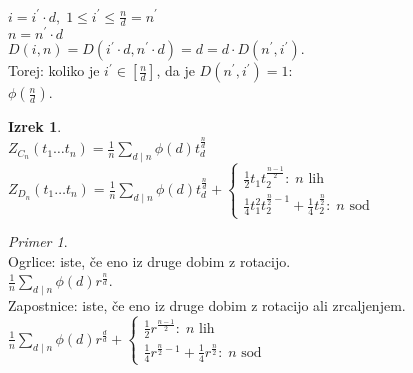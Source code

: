 \documentclass[a4paper, 12pt]{book}
\theoremstyle{definition}
\newtheorem{theorem}[counter]{Izrek}
\theoremstyle{remark}
\newtheorem*{ex}{Primer}
\begin{document}
$i = i^{'} \cdot d, \; 1 \leq i^{'} \leq \frac{n}{d} = n^{'}$ \\
$n = n^{'} \cdot d$ \\
$D(i, n) = D(i^{'} \cdot d, n^{'} \cdot d) = d = d \cdot D(n^{'}, i^{'})$. \\
Torej: koliko je $i^{'} \in \left[\frac{n}{d}\right]$, da je $D(n^{'}, i^{'}) = 1$: \\
$\phi\left(\frac{n}{d}\right)$.
\begin{theorem} \text{} \\
  $Z_{C_n}(t_1 \dots t_n) = \frac{1}{n} \sum_{d \mid n} \phi(d) t_d^{\frac{n}{d}}$ \\
  $Z_{D_n}(t_1 \dots t_n) = \frac{1}{n} \sum_{d \mid n} \phi(d) t_d^{\frac{n}{d}}
  + \begin{cases}
    \frac{1}{2} t_1 t_2^{\frac{n-1}{2}}: \; n \text{ lih} \\
    \frac{1}{4} t_1^2 t_2^{\frac{n}{2}-1} + \frac{1}{4} t_2^{\frac{n}{2}}: \; n \text{ sod}
  \end{cases}$ \\
\end{theorem}
\begin{ex} \text{} \\
  Ogrlice: %
  iste, če eno iz druge dobim z rotacijo. \\
  $\frac{1}{n} \sum_{d \mid n} \phi(d) r^{\frac{n}{d}}$. \\
  Zapostnice: %
  iste, če eno iz druge dobim z rotacijo ali zrcaljenjem. \\
  $\frac{1}{n} \sum_{d \mid n} \phi(d) r^{\frac{d}{d}}
  + \begin{cases}
    \frac{1}{2} r^{\frac{n-1}{2}}: \; n \text{ lih} \\
    \frac{1}{4} r^{\frac{n}{2}-1} + \frac{1}{4} r^{\frac{n}{2}}: \; n \text{ sod}
  \end{cases}$
\end{ex}



%
%



\end{document}
